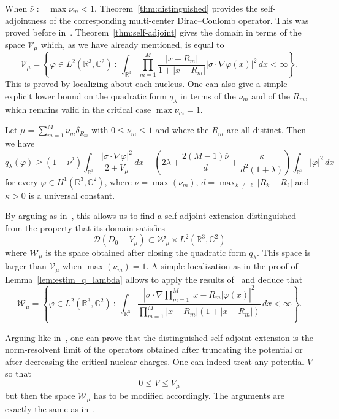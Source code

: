 \documentclass[AHL,Unicode,published]{cedram}
\newcommand{\R}{\mathbb{R}}
\newcommand{\C}{\mathbb{C}}
\newcommand{\cV}{\mathcal{V}}
\newcommand{\cD}{\mathcal{D}}
\newcommand{\cW}{\mathcal{W}}
\newcommand\1{{\ensuremath {\mathds 1} }}
\renewcommand\phi{\varphi}
\newcommand{\ii}{\infty}
\renewcommand{\geq}{\geqslant}
\renewcommand{\leq}{\leqslant}
\begin{document}
When $\bar\nu:=\max\nu_m<1$, Theorem~\ref{thm:distinguished} provides the self-adjointness of the corresponding multi-center Dirac--Coulomb operator. This was proved before in~\cite{Klaus-80b,Nenciu-77}. Theorem~\ref{thm:self-adjoint} gives the domain in terms of the space $\cV_\mu$ which, as we have already mentioned, is equal to
\[
\cV_\mu=\left\{\phi \in L^2\left(\R^3,\C^2\right)\ :\ \int_{\R^3}\prod_{m=1}^M\frac{|x-R_m|}{1+|x-R_m|}\left|\sigma\cdot\nabla \phi(x)\right|^2\,dx<\ii\right\}.
\]
This is proved by localizing about each nucleus. One can also give a simple explicit lower bound on the quadratic form $q_\lambda$ in terms of the $\nu_m$ and of the $R_m$, which remains valid in the critical case $\max\nu_m=1$.

\begin{lemm}\label{lem:estim_q_lambda}
Let $\mu=\sum_{m=1}^M\nu_m\delta_{R_m}$ with $0\leq \nu_m\leq 1$ and where the $R_m$ are all distinct. Then we have
\begin{equation*}
q_\lambda(\phi)\geq \left(1-\bar\nu^2\right)\int_{\R^3}\frac{\left|\sigma\cdot \nabla \phi\right|^2}{2+V_\mu}\,dx -\left(2\lambda+\frac{2(M-1)\bar\nu}{d}+\frac{\kappa}{d^2(1+\lambda)}\right)\int_{\R^3}|\phi|^2\,dx
\end{equation*}
for every $\phi\in H^1(\R^3,\C^2)$, where $\bar\nu=\max(\nu_m)$, $d=\max_{k\,\neq\,\ell}|R_k-R_\ell|$ and $\kappa>0$ is a universal constant.
\end{lemm}

By arguing as in~\cite{EstLos-07,EstLos-08,EstLewSer-19}, this allows us to find a self-adjoint extension distinguished from the property that its domain satisfies
\[
\cD\left(D_0-V_\mu\right)\subset \cW_\mu\times L^2\left(\R^3,\C^2\right)
\]
where $\cW_\mu$ is the space obtained after closing the quadratic form $q_\lambda$. This space is larger than $\cV_\mu$ when $\max(\nu_m)=1$. A simple localization as in the proof of Lemma~\ref{lem:estim_q_lambda} allows to apply the results of~\cite{EstLewSer-19} and deduce that
\begin{equation}
\cW_\mu=\left\{\phi \in L^2\left(\R^3,\C^2\right)\ :\ \int_{\R^3}\frac{\left|\sigma\cdot\nabla\prod_{m=1}^M \left|x-R_m\right| \phi(x)\right|^2}{\prod_{m=1}^M\left|x-R_m\right|\left(1+\left|x-R_m\right|\right)}\,dx<\ii\right\}.
\end{equation}

Arguing like in~\cite{EstLewSer-19}, one can prove that the distinguished self-adjoint extension is the norm-resolvent limit of the operators obtained after truncating the potential or after decreasing the critical nuclear charges. One can indeed treat any potential $V$ so that
\[
0\leq V\leq V_\mu
\]
but then the space $\cW_\mu$ has to be modified accordingly. The arguments are exactly the same as in~\cite{EstLewSer-19}.
\end{document}
